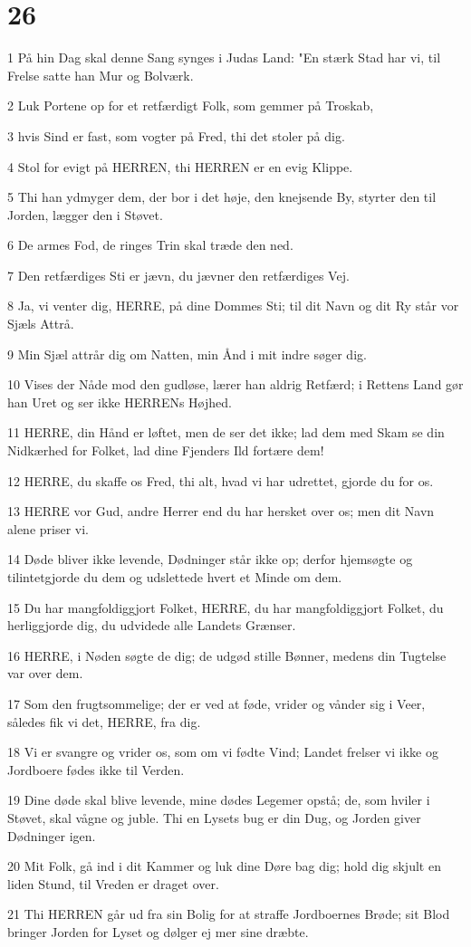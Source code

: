 \chapter{26}

\par 1 På hin Dag skal denne Sang synges i Judas Land: "En stærk Stad har vi, til Frelse satte han Mur og Bolværk.
\par 2 Luk Portene op for et retfærdigt Folk, som gemmer på Troskab,
\par 3 hvis Sind er fast, som vogter på Fred, thi det stoler på dig.
\par 4 Stol for evigt på HERREN, thi HERREN er en evig Klippe.
\par 5 Thi han ydmyger dem, der bor i det høje, den knejsende By, styrter den til Jorden, lægger den i Støvet.
\par 6 De armes Fod, de ringes Trin skal træde den ned.
\par 7 Den retfærdiges Sti er jævn, du jævner den retfærdiges Vej.
\par 8 Ja, vi venter dig, HERRE, på dine Dommes Sti; til dit Navn og dit Ry står vor Sjæls Attrå.
\par 9 Min Sjæl attrår dig om Natten, min Ånd i mit indre søger dig.
\par 10 Vises der Nåde mod den gudløse, lærer han aldrig Retfærd; i Rettens Land gør han Uret og ser ikke HERRENs Højhed.
\par 11 HERRE, din Hånd er løftet, men de ser det ikke; lad dem med Skam se din Nidkærhed for Folket, lad dine Fjenders Ild fortære dem!
\par 12 HERRE, du skaffe os Fred, thi alt, hvad vi har udrettet, gjorde du for os.
\par 13 HERRE vor Gud, andre Herrer end du har hersket over os; men dit Navn alene priser vi.
\par 14 Døde bliver ikke levende, Dødninger står ikke op; derfor hjemsøgte og tilintetgjorde du dem og udslettede hvert et Minde om dem.
\par 15 Du har mangfoldiggjort Folket, HERRE, du har mangfoldiggjort Folket, du herliggjorde dig, du udvidede alle Landets Grænser.
\par 16 HERRE, i Nøden søgte de dig; de udgød stille Bønner, medens din Tugtelse var over dem.
\par 17 Som den frugtsommelige; der er ved at føde, vrider og vånder sig i Veer, således fik vi det, HERRE, fra dig.
\par 18 Vi er svangre og vrider os, som om vi fødte Vind; Landet frelser vi ikke og Jordboere fødes ikke til Verden.
\par 19 Dine døde skal blive levende, mine dødes Legemer opstå; de, som hviler i Støvet, skal vågne og juble. Thi en Lysets bug er din Dug, og Jorden giver Dødninger igen.
\par 20 Mit Folk, gå ind i dit Kammer og luk dine Døre bag dig; hold dig skjult en liden Stund, til Vreden er draget over.
\par 21 Thi HERREN går ud fra sin Bolig for at straffe Jordboernes Brøde; sit Blod bringer Jorden for Lyset og dølger ej mer sine dræbte.

